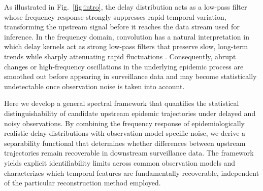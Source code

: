As illustrated in Fig.~\ref{fig:intro}, the delay distribution acts as a low-pass filter whose frequency response strongly suppresses rapid temporal variation, transforming the upstream signal before it reaches the data stream used for inference\cite{chitwood2022reconstructing, mcgough2020nowcasting}. In the frequency domain, convolution has a natural interpretation in which delay kernels act as strong low-pass filters that preserve slow, long-term trends while sharply attenuating rapid fluctuations \cite{oppenheim1999discrete, brigham1988fast}. Consequently, abrupt changes or high-frequency oscillations in the underlying epidemic process are smoothed out before appearing in surveillance data and may become statistically undetectable once observation noise is taken into account.

Here we develop a general spectral framework that quantifies the statistical distinguishability of candidate upstream epidemic trajectories under delayed and noisy observations. By combining the frequency response of epidemiologically realistic delay distributions with observation-model-specific noise, we derive a separability functional that determines whether differences between upstream trajectories remain recoverable in downstream surveillance data. The framework yields explicit identifiability limits across common observation models and characterizes which temporal features are fundamentally recoverable, independent of the particular reconstruction method employed.


